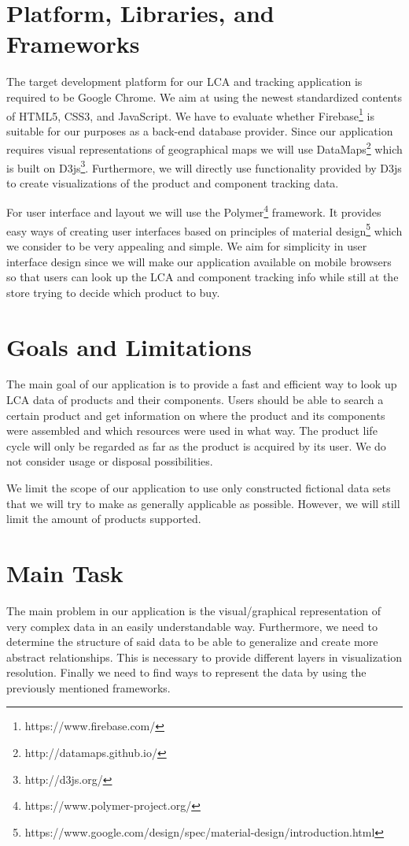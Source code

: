 \documentclass[a4page]{article}
\begin{document}
\section{Platform, Libraries, and Frameworks}
The target development platform for our LCA and tracking application is required to be Google Chrome. We aim at using the newest standardized contents of HTML5, CSS3, and JavaScript. We have to evaluate whether Firebase\footnote{https://www.firebase.com/} is suitable for our purposes as a back-end database provider.
Since our application requires visual representations of geographical maps we will use DataMaps\footnote{http://datamaps.github.io/} which is built on D3js\footnote{http://d3js.org/}.
Furthermore, we will directly use functionality provided by D3js to create visualizations of the product and component tracking data.

For user interface and layout we will use the Polymer\footnote{https://www.polymer-project.org/} framework. 
It provides easy ways of creating user interfaces based on principles of material design\footnote{https://www.google.com/design/spec/material-design/introduction.html} which we consider to be very appealing and simple.
We aim for simplicity in user interface design since we will make our application available on mobile browsers so that users can look up the LCA and component tracking info while still at the store trying to decide which product to buy.

\section{Goals and Limitations}
The main goal of our application is to provide a fast and efficient way to look up LCA data of products and their components.
Users should be able to search a certain product and get information on where the product and its components were assembled and which resources were used in what way.
The product life cycle will only be regarded as far as the product is acquired by its user.
We do not consider usage or disposal possibilities. 


We limit the scope of our application to use only constructed fictional data sets that we will try to make as generally applicable as possible. However, we will still limit the amount of products supported.

\section{Main Task}
The main problem in our application is the visual/graphical representation of very complex data in an easily understandable way.
Furthermore, we need to determine the structure of said data to be able to generalize and create more abstract relationships.
This is necessary to provide different layers in visualization resolution.
Finally we need to find ways to represent the data by using the previously mentioned frameworks.
\end{document}
